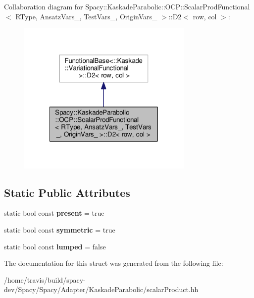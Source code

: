 Collaboration diagram for Spacy\-:\-:Kaskade\-Parabolic\-:\-:O\-C\-P\-:\-:Scalar\-Prod\-Functional$<$ R\-Type, Ansatz\-Vars\-\_\-, Test\-Vars\-\_\-, Origin\-Vars\-\_\- $>$\-:\-:D2$<$ row, col $>$\-:
\nopagebreak
\begin{figure}[H]
\begin{center}
\leavevmode
\includegraphics[width=242pt]{structSpacy_1_1KaskadeParabolic_1_1OCP_1_1ScalarProdFunctional_1_1D2__coll__graph}
\end{center}
\end{figure}
\subsection*{Static Public Attributes}
\begin{DoxyCompactItemize}
\item 
\hypertarget{structSpacy_1_1KaskadeParabolic_1_1OCP_1_1ScalarProdFunctional_1_1D2_af8b86f8ba94662542985a5b17232f57a}{static bool const {\bfseries present} = true}\label{structSpacy_1_1KaskadeParabolic_1_1OCP_1_1ScalarProdFunctional_1_1D2_af8b86f8ba94662542985a5b17232f57a}

\item 
\hypertarget{structSpacy_1_1KaskadeParabolic_1_1OCP_1_1ScalarProdFunctional_1_1D2_adc00f3a8474050cb572a369dae7c516e}{static bool const {\bfseries symmetric} = true}\label{structSpacy_1_1KaskadeParabolic_1_1OCP_1_1ScalarProdFunctional_1_1D2_adc00f3a8474050cb572a369dae7c516e}

\item 
\hypertarget{structSpacy_1_1KaskadeParabolic_1_1OCP_1_1ScalarProdFunctional_1_1D2_a52cedeb37382aaa33fcb466a7cfb68fb}{static bool const {\bfseries lumped} = false}\label{structSpacy_1_1KaskadeParabolic_1_1OCP_1_1ScalarProdFunctional_1_1D2_a52cedeb37382aaa33fcb466a7cfb68fb}

\end{DoxyCompactItemize}


The documentation for this struct was generated from the following file\-:\begin{DoxyCompactItemize}
\item 
/home/travis/build/spacy-\/dev/\-Spacy/\-Spacy/\-Adapter/\-Kaskade\-Parabolic/scalar\-Product.\-hh\end{DoxyCompactItemize}
